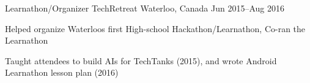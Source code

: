 \begin{cventries}
  \cventry
    {Learnathon/Organizer}
    {TechRetreat}
    {Waterloo, Canada}
    {Jun 2015--Aug 2016}
    {
      \begin{cvitems}
        \item {Helped organize Waterloos first High-school Hackathon/Learnathon, Co-ran the Learnathon}
        \item {Taught attendees to build AIs for TechTanks (2015), and wrote Android Learnathon lesson plan (2016)}
      \end{cvitems}
    }

\end{cventries}